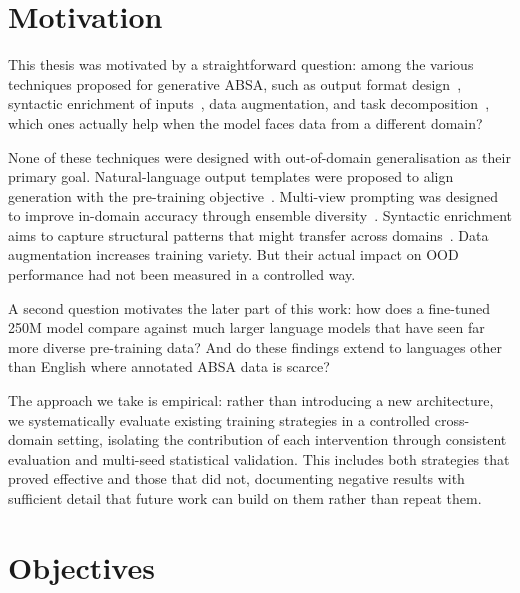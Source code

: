 \documentclass[12pt,a4paper]{report}
\begin{document}
\section{Motivation}

This thesis was motivated by a straightforward question: among the various techniques proposed for generative ABSA, such as output format design~\cite{zhang2021aspect}, syntactic enrichment of inputs~\cite{zhang2019aspect}, data augmentation, and task decomposition~\cite{xie2025star}, which ones actually help when the model faces data from a different domain?

None of these techniques were designed with out-of-domain generalisation as their primary goal. Natural-language output templates were proposed to align generation with the pre-training objective~\cite{zhang2021aspect}. Multi-view prompting was designed to improve in-domain accuracy through ensemble diversity~\cite{gou2023mvp}. Syntactic enrichment aims to capture structural patterns that might transfer across domains~\cite{zhang2019aspect}. Data augmentation increases training variety. But their actual impact on OOD performance had not been measured in a controlled way.

A second question motivates the later part of this work: how does a fine-tuned 250M model compare against much larger language models that have seen far more diverse pre-training data? And do these findings extend to languages other than English where annotated ABSA data is scarce?

The approach we take is empirical: rather than introducing a new architecture, we systematically evaluate existing training strategies in a controlled cross-domain setting, isolating the contribution of each intervention through consistent evaluation and multi-seed statistical validation. This includes both strategies that proved effective and those that did not, documenting negative results with sufficient detail that future work can build on them rather than repeat them.


\section{Objectives}
\end{document}
